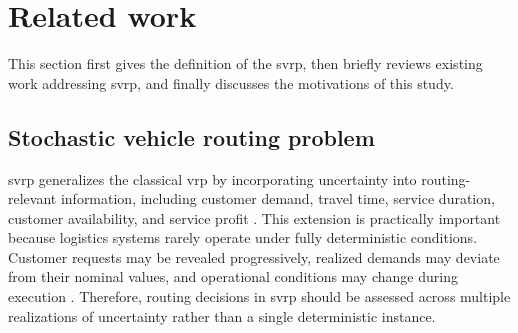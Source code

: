 \documentclass[pdflatex]{sn-jnl}
\begin{document}




\section{Related work} \label{sec:related}
This section first gives the definition of the \gls{svrp}, then briefly reviews existing work addressing \gls{svrp}, and finally discusses the motivations of this study.

\subsection{Stochastic vehicle routing problem}

\gls{svrp} generalizes the classical \gls{vrp} by incorporating uncertainty into routing-relevant information, including customer demand, travel time, service duration, customer availability, and service profit \cite{zhao2025two}. This extension is practically important because logistics systems rarely operate under fully deterministic conditions. Customer requests may be revealed progressively, realized demands may deviate from their nominal
values, and operational conditions may change during execution \cite{hoogendoorn2025evaluation}. Therefore, routing decisions in \gls{svrp} should be assessed across multiple realizations of uncertainty rather than a single deterministic instance.
\end{document}
